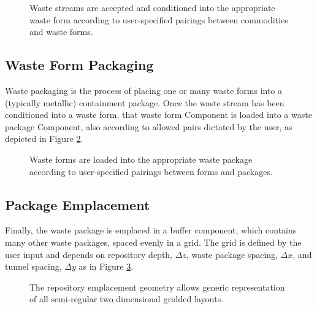 \begin{figure}[htbp!]
\begin{center}
\def\svgwidth{.5\textwidth}

\end{center}
\caption[Waste stream conditioning in \Cyder.]{Waste streams are accepted and 
conditioned into the appropriate waste form according to user-specified 
pairings between commodities and waste forms.}
\label{fig:ws_conditioning}
\end{figure}

\subsection{Waste Form Packaging}

Waste packaging is the process of placing one or many waste forms into a 
(typically metallic) containment package. Once the waste stream has been 
conditioned into a waste form, that waste form Component is loaded into a waste 
package Component, also according to allowed pairs dictated by the user, as 
depicted in Figure \ref{fig:wf_packaging}.

\begin{figure}[htbp!]
\begin{center}
\def\svgwidth{.5\textwidth}

\end{center}
\caption[Waste packaging in \Cyder.]{Waste forms are loaded into the 
appropriate waste package according to user-specified pairings between forms 
and packages.}
\label{fig:wf_packaging}
\end{figure}


\subsection{Package Emplacement}

Finally, the waste package is emplaced in a buffer component, which 
contains many other waste packages, spaced evenly in a grid. The grid is 
defined by the user input and depends on repository depth, $\Delta z$, waste 
package spacing, $\Delta x$, and tunnel spacing, $\Delta y$ as in Figure 
\ref{fig:repo_layout}.

\begin{figure}[htbp!]
\begin{center}
\def\svgwidth{.5\textwidth}

\end{center}
\caption[The gridded \Cyder repository emplacement geometry.]{The \Cyder 
repository emplacement geometry allows generic representation of all semi-regular 
two dimensional gridded layouts.}
\label{fig:repo_layout}
\end{figure}

